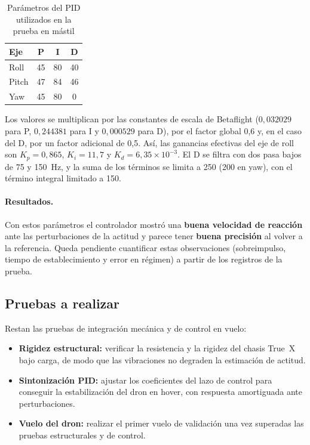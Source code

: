\documentclass[12pt, letterpaper]{report}
\begin{document}
\begin{table}[htbp]
\centering
\caption{Parámetros del PID utilizados en la prueba en mástil}
\label{tab:pid_mastil}
\renewcommand{\arraystretch}{1.3}
\small
\begin{tabular}{@{}l c c c@{}}
\toprule
\rowcolor{gray!20}
\textbf{Eje} & \textbf{P} & \textbf{I} & \textbf{D} \\
\midrule
Roll & 45 & 80 & 40 \\
Pitch & 47 & 84 & 46 \\
Yaw & 45 & 80 & 0 \\
\bottomrule
\end{tabular}
\end{table}

Los valores se multiplican por las constantes de escala de Betaflight ($0{,}032029$ para P, $0{,}244381$ para I y $0{,}000529$ para D), por el factor global 0,6 y, en el caso del D, por un factor adicional de 0,5. Así, las ganancias efectivas del eje de roll son $K_p = 0{,}865$, $K_i = 11{,}7$ y $K_d = 6{,}35\times10^{-3}$. El D se filtra con dos pasa bajos de 75 y 150~Hz, y la suma de los términos se limita a 250 (200 en yaw), con el término integral limitado a 150.

\paragraph{Resultados.} Con estos parámetros el controlador mostró una \textbf{buena velocidad de reacción} ante las perturbaciones de la actitud y parece tener \textbf{buena precisión} al volver a la referencia. Queda pendiente cuantificar estas observaciones (sobreimpulso, tiempo de establecimiento y error en régimen) a partir de los registros de la prueba.

\subsection{Pruebas a realizar}
Restan las pruebas de integración mecánica y de control en vuelo:

\begin{itemize}
    \item \textbf{Rigidez estructural:} verificar la resistencia y la rigidez del chasis True~X bajo carga, de modo que las vibraciones no degraden la estimación de actitud.

    \item \textbf{Sintonización PID:} ajustar los coeficientes del lazo de control para conseguir la estabilización del dron en hover, con respuesta amortiguada ante perturbaciones.

    \item \textbf{Vuelo del dron:} realizar el primer vuelo de validación una vez superadas las pruebas estructurales y de control.
\end{itemize}
\pagebreak
\end{document}
